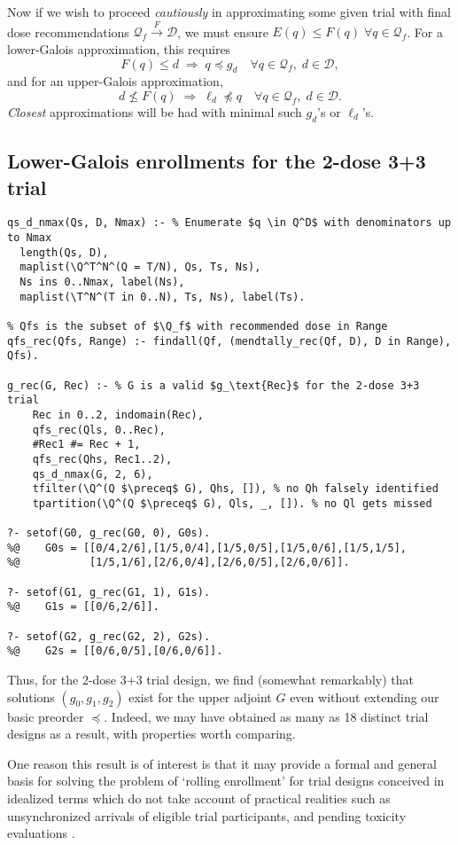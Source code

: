 \documentclass{article}
\newcommand{\D}{\ensuremath{\mathcal{D}}}
\newcommand{\Q}{\ensuremath{\mathcal{Q}}}
\begin{document}
Now if we wish to proceed {\em cautiously} in approximating some given trial with final dose recommendations $\Q_f\!\xrightarrow{F} \D$, we must ensure $E(q) \le F(q) \;\forall q \in \Q_f$.  For a lower-Galois approximation, this requires
\begin{equation}
F(q) \le d \; \Longrightarrow \; q \preceq g_d \quad \forall q \in \Q_f,\; d \in \D, \label{gconstraint}
\end{equation}
and for an upper-Galois approximation,
\begin{equation}
d \not\le F(q) \; \Longrightarrow \; \ell_d \not\preceq q \quad \forall q \in \Q_f,\; d \in \D. \label{gconstraint}
\end{equation}
{\em Closest} approximations will be had with minimal such $g_d$'s or $\ell_d$'s.

\subsection{Lower-Galois enrollments for the 2-dose \mbox{3+3} trial}

\begin{lstlisting}
qs_d_nmax(Qs, D, Nmax) :- % Enumerate $q \in Q^D$ with denominators up to Nmax
  length(Qs, D),
  maplist(\Q^T^N^(Q = T/N), Qs, Ts, Ns),
  Ns ins 0..Nmax, label(Ns),
  maplist(\T^N^(T in 0..N), Ts, Ns), label(Ts).

% Qfs is the subset of $\Q_f$ with recommended dose in Range
qfs_rec(Qfs, Range) :- findall(Qf, (mendtally_rec(Qf, D), D in Range), Qfs).

g_rec(G, Rec) :- % G is a valid $g_\text{Rec}$ for the 2-dose 3+3 trial
    Rec in 0..2, indomain(Rec),
    qfs_rec(Qls, 0..Rec),
    #Rec1 #= Rec + 1,
    qfs_rec(Qhs, Rec1..2),
    qs_d_nmax(G, 2, 6),
    tfilter(\Q^(Q $\preceq$ G), Qhs, []), % no Qh falsely identified
    tpartition(\Q^(Q $\preceq$ G), Qls, _, []). % no Ql gets missed

?- setof(G0, g_rec(G0, 0), G0s).
%@    G0s = [[0/4,2/6],[1/5,0/4],[1/5,0/5],[1/5,0/6],[1/5,1/5],
%@           [1/5,1/6],[2/6,0/4],[2/6,0/5],[2/6,0/6]].

?- setof(G1, g_rec(G1, 1), G1s).
%@    G1s = [[0/6,2/6]].

?- setof(G2, g_rec(G2, 2), G2s).
%@    G2s = [[0/6,0/5],[0/6,0/6]].
\end{lstlisting}

Thus, for the 2-dose \mbox{3+3} trial design, we find (somewhat remarkably) that solutions $(g_0, g_1, g_2)$ exist for the upper adjoint $G$ even without extending our basic preorder $\preceq$.  Indeed, we may have obtained as many as 18 distinct trial designs as a result, with properties worth comparing.

One reason this result is of interest is that it may provide a formal and general basis for solving the problem of `rolling enrollment' \cite{skolnik_clinical_2007} for trial designs conceived in idealized terms which do not take account of practical realities such as unsynchronized arrivals of eligible trial participants, and pending toxicity evaluations \cite{frankel_model_2020}.



\end{document}
